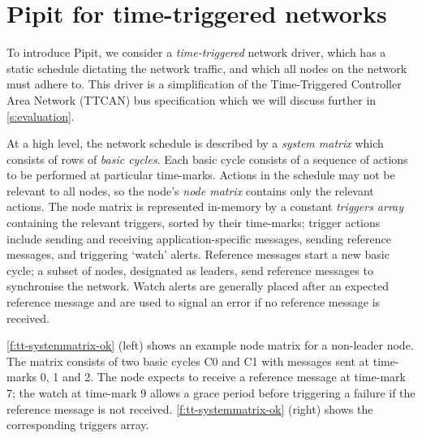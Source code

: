 
\section{Pipit for time-triggered networks}
\label{s:motivation}

To introduce Pipit, we consider a \emph{time-triggered} network driver, which has a static schedule dictating the network traffic, and which all nodes on the network must adhere to.
This driver is a simplification of the Time-Triggered Controller Area Network (TTCAN) bus specification \cite{fuehrer2001time} which we will discuss further in \autoref{s:evaluation}.

At a high level, the network schedule is described by a \emph{system matrix} which consists of rows of \emph{basic cycles}.
Each basic cycle consists of a sequence of actions to be performed at particular time-marks.
Actions in the schedule may not be relevant to all nodes, so the node's \emph{node matrix} contains only the relevant actions.
The node matrix is represented in-memory by a constant \emph{triggers array} containing the relevant triggers, sorted by their time-marks; trigger actions include sending and receiving application-specific messages, sending reference messages, and triggering `watch' alerts.
Reference messages start a new basic cycle; a subset of nodes, designated as leaders, send reference messages to synchronise the network.
Watch alerts are generally placed after an expected reference message and are used to signal an error if no reference message is received.

\autoref{f:tt-systemmatrix-ok} (left) shows an example node matrix for a non-leader node.
The matrix consists of two basic cycles C0 and C1 with messages sent at time-marks 0, 1 and 2.
The node expects to receive a reference message at time-mark 7; the watch at time-mark 9 allows a grace period before triggering a failure if the reference message is not received.
\autoref{f:tt-systemmatrix-ok} (right) shows the corresponding triggers array.

